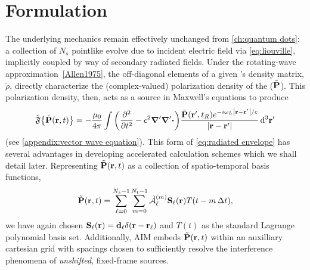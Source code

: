 \section{Formulation}

The underlying mechanics remain effectively unchanged from \cref{ch:quantum dots}: a collection of $N_s$ pointlike \qds{} evolve due to incident electric field via \cref{eq:liouville}, implicitly coupled by way of secondary radiated fields.
Under the rotating-wave approximation~\cref{Allen1975}, the off-diagonal elements of a given \qd's density matrix, $\tilde{\rho}$, directly characterize the (complex-valued) polarization density of the \qd ($\tilde{\vb{P}}$).
This polarization density, then, acts as a source in Maxwell's equations to produce
\begin{equation}
  \tilde{\mathfrak{F}}\qty{\tilde{\vb{P}}(\vb{r}, t)} = -\frac{\mu_0}{4\pi} \int \qty(\pdv[2]{t} - c^2 \grad' \grad'\boldsymbol{\cdot}) \frac{\tilde{\vb{P}}(\vb{r}', t_R) e^{-i \omega_L \abs{\vb{r} - \vb{r}'}/c}}{\abs{\vb{r} - \vb{r}'}} \dd[3]{\vb{r}'}
\end{equation}
(see \cref{appendix:vector wave equation}).
This form of \cref{eq:radiated envelope} has several advantages in developing accelerated calculation schemes which we shall detail later.
Representing $\tilde{\vb{P}}(\vb{r}, t)$ as a collection of spatio-temporal basis functions,
\begin{equation}
  \tilde{\vb{P}}(\vb{r}, t) = \sum_{\ell = 0}^{N_s - 1} \sum_{m = 0}^{N_t - 1} \tilde{\mathcal{A}}_\ell^{(m)} \vb{S}_\ell(\vb{r}) T(t - m \, \Delta t),
\end{equation}
we have again chosen $\vb{S}_\ell(\vb{r}) = \vb{d}_\ell \delta(\vb{r} - \vb{r}_\ell)$ and $T(t)$ as the standard Lagrange polynomial basis set.
Additionally, AIM embeds $\tilde{\vb{P}}(\vb{r}, t)$ within an auxilliary cartesian grid with spacings chosen to sufficiently resolve the interference phenomena of \emph{unshifted}, fixed-frame sources.
